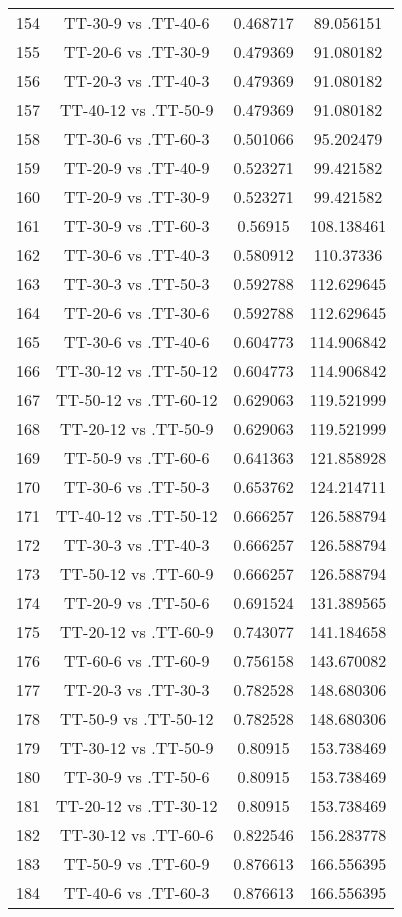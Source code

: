 \documentclass[a4paper,10pt]{article}
\begin{document}
\begin{landscape}
\begin{table}[!htp]
\begin{tabular}{cccc}
154&TT-30-9 vs .TT-40-6&0.468717&89.056151\\
155&TT-20-6 vs .TT-30-9&0.479369&91.080182\\
156&TT-20-3 vs .TT-40-3&0.479369&91.080182\\
157&TT-40-12 vs .TT-50-9&0.479369&91.080182\\
158&TT-30-6 vs .TT-60-3&0.501066&95.202479\\
159&TT-20-9 vs .TT-40-9&0.523271&99.421582\\
160&TT-20-9 vs .TT-30-9&0.523271&99.421582\\
161&TT-30-9 vs .TT-60-3&0.56915&108.138461\\
162&TT-30-6 vs .TT-40-3&0.580912&110.37336\\
163&TT-30-3 vs .TT-50-3&0.592788&112.629645\\
164&TT-20-6 vs .TT-30-6&0.592788&112.629645\\
165&TT-30-6 vs .TT-40-6&0.604773&114.906842\\
166&TT-30-12 vs .TT-50-12&0.604773&114.906842\\
167&TT-50-12 vs .TT-60-12&0.629063&119.521999\\
168&TT-20-12 vs .TT-50-9&0.629063&119.521999\\
169&TT-50-9 vs .TT-60-6&0.641363&121.858928\\
170&TT-30-6 vs .TT-50-3&0.653762&124.214711\\
171&TT-40-12 vs .TT-50-12&0.666257&126.588794\\
172&TT-30-3 vs .TT-40-3&0.666257&126.588794\\
173&TT-50-12 vs .TT-60-9&0.666257&126.588794\\
174&TT-20-9 vs .TT-50-6&0.691524&131.389565\\
175&TT-20-12 vs .TT-60-9&0.743077&141.184658\\
176&TT-60-6 vs .TT-60-9&0.756158&143.670082\\
177&TT-20-3 vs .TT-30-3&0.782528&148.680306\\
178&TT-50-9 vs .TT-50-12&0.782528&148.680306\\
179&TT-30-12 vs .TT-50-9&0.80915&153.738469\\
180&TT-30-9 vs .TT-50-6&0.80915&153.738469\\
181&TT-20-12 vs .TT-30-12&0.80915&153.738469\\
182&TT-30-12 vs .TT-60-6&0.822546&156.283778\\
183&TT-50-9 vs .TT-60-9&0.876613&166.556395\\
184&TT-40-6 vs .TT-60-3&0.876613&166.556395\\

\end{tabular}
\end{table}
\end{landscape}
\end{document}
